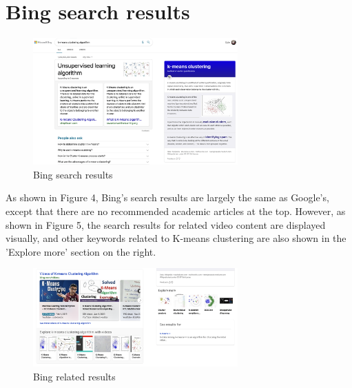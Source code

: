 \documentclass{article}
\begin{document}
    \section{Bing search results}
    \begin{figure}[ht]
        \centering
        \includegraphics[width=0.7\textwidth]{Bing_home.png}
        \caption{Bing search results}
    \end{figure}
    As shown in Figure 4, Bing's search results are largely the same as Google's, except that there are no recommended academic articles at the top. However, as shown in Figure 5, the search results for related video content are displayed visually, and other keywords related to K-means clustering are also shown in the 'Explore more' section on the right.
    \begin{figure}[ht]
        \centering
        \includegraphics[width=0.7\textwidth]{Bing1.png}
        \caption{Bing related results}
    \end{figure}
\end{document}
